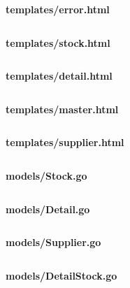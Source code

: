 \documentclass[20pt,a4paper]{report}
\begin{document}
		\qquad \textbf{templates/error.html} \\
		\small
		\inputminted[tabsize=4, linenos, breaklines]{html}{templates/error.html}
		\large	
		
		\qquad \textbf{templates/stock.html} \\
		\small
		\inputminted[tabsize=4, linenos, breaklines]{html}{templates/stock.html}
		\large	
		
		\qquad \textbf{templates/detail.html} \\
		\small
		\inputminted[tabsize=4, linenos, breaklines]{html}{templates/detail.html}
		\large	
		
		\qquad \textbf{templates/master.html} \\
		\small
		\inputminted[tabsize=4, linenos, breaklines]{html}{templates/master.html}
		\large	
		
		\qquad \textbf{templates/supplier.html} \\
		\small
		\inputminted[tabsize=4, linenos, breaklines]{html}{templates/supplier.html}
		\large	
		
		\qquad \textbf{models/Stock.go} \\
		\small
		\inputminted[tabsize=4, linenos, breaklines]{go}{models/Stock.go}
		\large	
		
		\qquad \textbf{models/Detail.go} \\
		\small
		\inputminted[tabsize=4, linenos, breaklines]{go}{models/Detail.go}
		\large	
		
		\qquad \textbf{models/Supplier.go} \\
		\small
		\inputminted[tabsize=4, linenos, breaklines]{go}{models/Supplier.go}
		\large	
		
		\qquad \textbf{models/DetailStock.go} \\
		\small
		\inputminted[tabsize=4, linenos, breaklines]{go}{models/DetailStock.go}
		\large	
		
\end{document}
